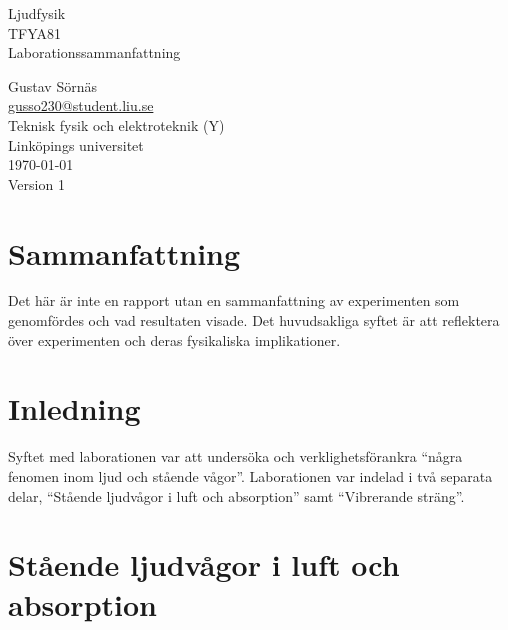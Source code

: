 \documentclass[a4paper,12pt]{article}  %
\begin{document}
\begin{titlepage}
  \centering
  \vspace{10cm}
  {\Huge Ljudfysik \\}
  \vspace{0.8em}
  {\Large TFYA81\\}
  \vspace{2cm}
  {\Large Laborationssammanfattning}
  \vfill

  {
    Gustav Sörnäs \\
    \url{gusso230@student.liu.se} \\  %
    \vspace{2cm}
    Teknisk fysik och elektroteknik (Y) \\
    Linköpings universitet\\\today{}\\Version 1
  }
\end{titlepage}

\section*{Sammanfattning}

Det här är inte en rapport utan en sammanfattning av experimenten som
genomfördes och vad resultaten visade. Det huvudsakliga syftet är att
reflektera över experimenten och deras fysikaliska implikationer.

\clearpage

\tableofcontents
\listoffigures

\clearpage


\section{Inledning}

Syftet med laborationen var att undersöka och verklighetsförankra ``några
fenomen inom ljud och stående vågor''. Laborationen var indelad i två separata
delar, ``Stående ljudvågor i luft och absorption'' samt ``Vibrerande sträng''.

\section{Stående ljudvågor i luft och absorption}
\end{document}
